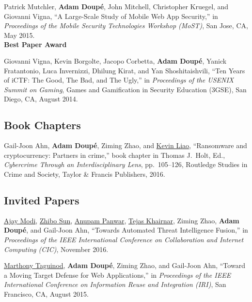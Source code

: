 \documentclass[11pt,letterpaper,sans]{moderncv}
\begin{document}
\begin{etaremune}
\item Patrick Mutchler, \textbf{Adam Doup\'e}, John Mitchell,
  Christopher Kruegel, and Giovanni Vigna, ``A Large-Scale Study of
  Mobile Web App Security,'' in \emph{Proceedings of the Mobile
    Security Technologies Workshop (MoST)}, San Jose, CA, May 2015. \\
  \textbf{Best Paper Award}

\item Giovanni Vigna, Kevin Borgolte, Jacopo Corbetta, \textbf{Adam
  Doup\'e}, Yanick Fratantonio, Luca Invernizzi, Dhilung Kirat, and
  Yan Shoshitaishvili, ``Ten Years of iCTF: The Good, The Bad, and The
  Ugly,'' in \emph{Proceedings of the USENIX Summit on Gaming}, Games
  and Gamification in Security Education (3GSE), San Diego, CA, August
  2014.

\end{etaremune}

\subsection{Book Chapters}

\begin{etaremune}

\item Gail-Joon Ahn, \textbf{Adam Doup\'e}, Ziming Zhao, and
  \underline{Kevin Liao}, ``Ransomware and cryptocurrency: Partners in
  crime,'' book chapter in Thomas J.\ Holt, Ed., \emph{Cybercrime
    Through an Interdisciplinary Lens}, pp.\ 105--126, Routledge
  Studies in Crime and Society, Taylor \& Francis Publishers, 2016.
  
\end{etaremune}

\subsection{Invited Papers}

\begin{etaremune}

\item \underline{Ajay Modi}, \underline{Zhibo Sun}, \underline{Anupam
  Panwar}, \underline{Tejas Khairnar}, Ziming Zhao, \textbf{Adam
  Doup\'e}, and Gail-Joon Ahn, ``Towards Automated Threat Intelligence
  Fusion,'' in \emph{Proceedings of the IEEE International Conference
    on Collaboration and Internet Computing (CIC)}, November 2016.

\item \underline{Marthony Taguinod}, \textbf{Adam Doup\'e}, Ziming
  Zhao, and Gail-Joon Ahn, ``Toward a Moving Target Defense for Web
  Applications,'' in \emph{Proceedings of the IEEE International
    Conference on Information Reuse and Integration (IRI)}, San
  Francisco, CA, August 2015.
\end{etaremune}
\end{document}
